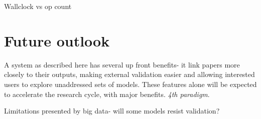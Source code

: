 \documentclass[conference]{IEEEtran}
\begin{document}
Wallclock vs op count

\section{Future outlook}

A system as described here has several up front benefits- it link papers 
more closely to their outputs, making external validation easier and 
allowing interested users to explore unaddressed sets of models. These 
features alone will be expected to accelerate the research cycle, with
major benefits. \emph{4th paradigm}.

Limitations presented by big data- will some models resist validation?






\end{document}
